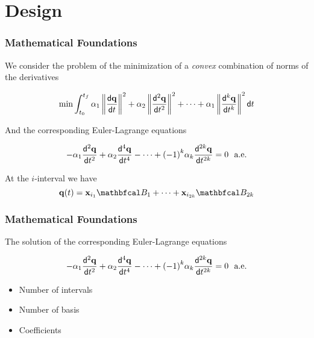 
\section{Design}
\begin{frame}[t]
	\frametitle{Mathematical Foundations}

	We consider the problem of the minimization of a \emph{convex} combination of norms of the derivatives

	\begin{equation*}
		\min \int_{t_0}^{t_f} \alpha_1 \left\|\frac{\mathsf{d} \mathbf{q}}{\mathsf{d} t}\right\|^2 + \alpha_2 \left\|\frac{\mathsf{d}^{2} \mathbf{q}}{\mathsf{d} t^{2}}\right\|^2 + \cdots  + \alpha_1 \left\|\frac{\mathsf{d}^{k} \mathbf{q}}{\mathsf{d} t^{k}} \right\|^2 \mathsf{d} t
	\end{equation*}

	And the corresponding Euler-Lagrange equations

	\begin{equation*}
		-\alpha_1 \diffk{\qv}{t}{2}+ \alpha_2 \diffk{\qv}{t}{4}- \cdots +  {(-1)}^k \alpha_k \diffk{\qv}{t}{2k}= 0 \ \ \text{a.e.}
	\end{equation*}

	At the $i$-interval we have
	\begin{equation*}
		\qv(t) = \xv_{i_1} \basis_1 + \cdots +  \xv_{i_{2k}} \basis_{2k}
	\end{equation*}
\end{frame}
\begin{frame}[t]
	\frametitle{Mathematical Foundations}


	The solution of the corresponding Euler-Lagrange equations

	\begin{equation*}
		-\alpha_1 \diffk{\qv}{t}{2}+ \alpha_2 \diffk{\qv}{t}{4}- \cdots +  {(-1)}^k \alpha_k \diffk{\qv}{t}{2k}= 0 \ \ \text{a.e.}
	\end{equation*}
	\begin{itemize}
		\item  Number of intervals
		\item Number of basis
		\item Coefficients
	\end{itemize}
\end{frame}

